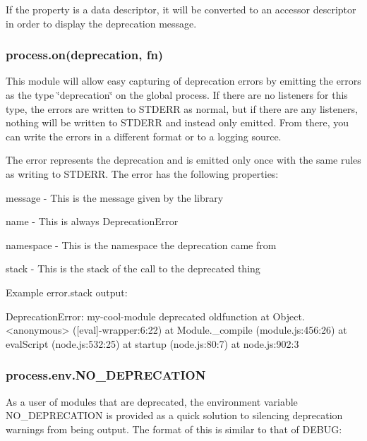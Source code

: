 If the property is a data descriptor, it will be converted to an accessor descriptor in order to display the deprecation message.

\subsubsection*{process.\+on(\textquotesingle{}deprecation\textquotesingle{}, fn)}

This module will allow easy capturing of deprecation errors by emitting the errors as the type \char`\"{}deprecation\char`\"{} on the global {\ttfamily process}. If there are no listeners for this type, the errors are written to S\+T\+D\+E\+RR as normal, but if there are any listeners, nothing will be written to S\+T\+D\+E\+RR and instead only emitted. From there, you can write the errors in a different format or to a logging source.

The error represents the deprecation and is emitted only once with the same rules as writing to S\+T\+D\+E\+RR. The error has the following properties\+:


\begin{DoxyItemize}
\item {\ttfamily message} -\/ This is the message given by the library
\item {\ttfamily name} -\/ This is always {\ttfamily \textquotesingle{}Deprecation\+Error\textquotesingle{}}
\item {\ttfamily namespace} -\/ This is the namespace the deprecation came from
\item {\ttfamily stack} -\/ This is the stack of the call to the deprecated thing
\end{DoxyItemize}

Example {\ttfamily error.\+stack} output\+:


\begin{DoxyCode}
DeprecationError: my-cool-module deprecated oldfunction
    at Object.<anonymous> ([eval]-wrapper:6:22)
    at Module.\_compile (module.js:456:26)
    at evalScript (node.js:532:25)
    at startup (node.js:80:7)
    at node.js:902:3
\end{DoxyCode}


\subsubsection*{process.\+env.\+N\+O\+\_\+\+D\+E\+P\+R\+E\+C\+A\+T\+I\+ON}

As a user of modules that are deprecated, the environment variable {\ttfamily N\+O\+\_\+\+D\+E\+P\+R\+E\+C\+A\+T\+I\+ON} is provided as a quick solution to silencing deprecation warnings from being output. The format of this is similar to that of {\ttfamily D\+E\+B\+UG}\+:



